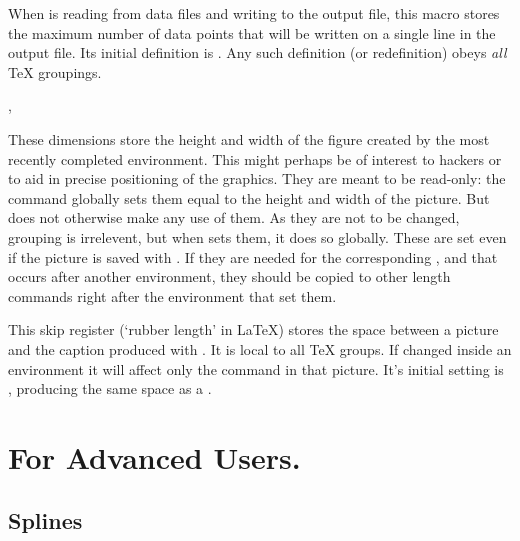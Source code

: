 \documentclass[letterpaper]{article}
\begin{document}
When \mfp{} is reading from data files and writing to the output file,
this macro stores the maximum number of data points that will be written
on a single line in the output file. Its initial definition is
. Any such definition (or
redefinition) obeys \emph{all} \TeX{} groupings.

\begin{cd}
, %
%
\end{cd}

These dimensions store the height and width of the figure created by the
most recently completed  environment. This might perhaps be
of interest to hackers or to aid in precise positioning of the graphics.
They are meant to be read-only: the  command globally sets
them equal to the height and width of the picture. But \mfp{} does not
otherwise make any use of them. As they are not to be changed, grouping
is irrelevent, but when \mfp{} sets them, it does so globally. These are
set even if the picture is saved with . If they are needed
for the corresponding , and that occurs after another
 environment, they should be copied to other length commands
right after the  environment that set them.

\begin{cd}
%
\end{cd}

This skip register (`rubber length' in \LaTeX) stores the space between
a picture and the caption produced with . It is local to
all \TeX{} groups. If changed inside an  environment it will
affect only the  command in that picture. It's initial
setting is , producing the same space as a
.


\section{For Advanced Users.}\label{advanced}

\subsection{Splines}\label{splines}

\begin{cd}
\\
\\
\\
%
%
%
%
%
\end{cd}
\end{document}
